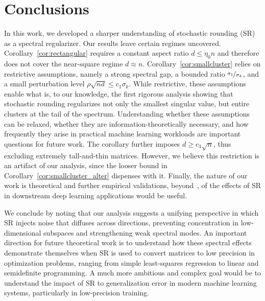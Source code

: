 \documentclass{article}
\begin{document}
\section{Conclusions}\label{sec:conclusion}

In this work, we developed a sharper understanding of stochastic rounding (SR) as a spectral regularizer. %
%
Our results leave certain regimes uncovered. Corollary~\ref{cor:rectangular} 
requires a constant aspect ratio $d \le \eta_0 n$ and therefore does not 
cover the near-square regime $d \approx n$. Corollary~\ref{cor:smallcluster} relies on restrictive assumptions, namely a strong spectral gap, a bounded ratio $\nicefrac{\sigma_1}{\sigma_k}$, and a small perturbation level 
$\rho\sqrt{nd} \le c_1 \sigma_k$. While restrictive, these assumptions enable what is, to our knowledge, the first rigorous analysis showing that stochastic rounding regularizes not only the smallest singular value, but entire clusters at the tail of the spectrum. Understanding whether these assumptions can be relaxed, whether they are information-theoretically necessary, and how frequently they arise in practical machine learning workloads are important questions for future work. The corollary further imposes  $d \ge c_3 \sqrt{n}$, thus excluding extremely tall-and-thin matrices. However, we believe this restriction is an artifact of our analysis, since the looser bound in Corollary~\ref{cor:smallcluster_alter} dispenses with it. Finally, the nature of our work is theoretical and further empirical validations, beyond~\citep{gupta2015deep,ali2024stochastic}, of the effects of SR in downstream deep learning applications would be useful.

We conclude by noting that our analysis suggests a unifying perspective in which SR injects noise that diffuses across directions, preventing concentration in low-dimensional subspaces and strengthening weak spectral modes. 
%
%
An important direction for future theoretical work is to understand how these spectral effects demonstrate themselves when SR is used to convert matrices to low precision in optimization problems, ranging from simple least-squares regression to linear and semidefinite programming. A much more ambitious and complex goal would be to understand the impact of SR to generalization error in modern machine learning systems, particularly in low-precision training.
\end{document}
